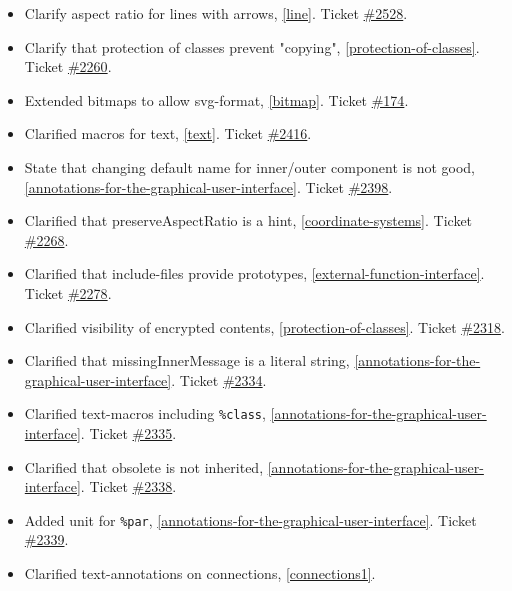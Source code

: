 \begin{itemize}
\begin{itemize}
\item Clarify aspect ratio for lines with arrows, \cref{line}.
Ticket \href{https://github.com/modelica/ModelicaSpecification/issues/2528}{\#2528}.
\item Clarify that protection of classes prevent "copying", \cref{protection-of-classes}.
Ticket \href{https://github.com/modelica/ModelicaSpecification/issues/2260}{\#2260}.
\item Extended bitmaps to allow svg-format, \cref{bitmap}.
Ticket \href{https://github.com/modelica/ModelicaSpecification/issues/174}{\#174}.
\item Clarified macros for text, \cref{text}.
Ticket \href{https://github.com/modelica/ModelicaSpecification/issues/2416}{\#2416}.
\item State that changing default name for inner/outer component is not good, \cref{annotations-for-the-graphical-user-interface}.
Ticket \href{https://github.com/modelica/ModelicaSpecification/issues/2398}{\#2398}.
\item Clarified that preserveAspectRatio is a hint, \cref{coordinate-systems}.
Ticket \href{https://github.com/modelica/ModelicaSpecification/issues/2268}{\#2268}.
\item Clarified that include-files provide prototypes, \cref{external-function-interface}.
Ticket \href{https://github.com/modelica/ModelicaSpecification/issues/2278}{\#2278}.
\item Clarified visibility of encrypted contents, \cref{protection-of-classes}.
Ticket \href{https://github.com/modelica/ModelicaSpecification/issues/2318}{\#2318}.
\item Clarified that missingInnerMessage is a literal string, \cref{annotations-for-the-graphical-user-interface}.
Ticket \href{https://github.com/modelica/ModelicaSpecification/issues/2334}{\#2334}.
\item Clarified text-macros including \lstinline!%class!, \cref{annotations-for-the-graphical-user-interface}.
Ticket \href{https://github.com/modelica/ModelicaSpecification/issues/2335}{\#2335}.
\item Clarified that obsolete is not inherited, \cref{annotations-for-the-graphical-user-interface}.
Ticket \href{https://github.com/modelica/ModelicaSpecification/issues/2338}{\#2338}.
\item Added unit for \lstinline!%par!, \cref{annotations-for-the-graphical-user-interface}.
Ticket \href{https://github.com/modelica/ModelicaSpecification/issues/2339}{\#2339}.
\item Clarified text-annotations on connections, \cref{connections1}.

\end{itemize}
\end{itemize}
